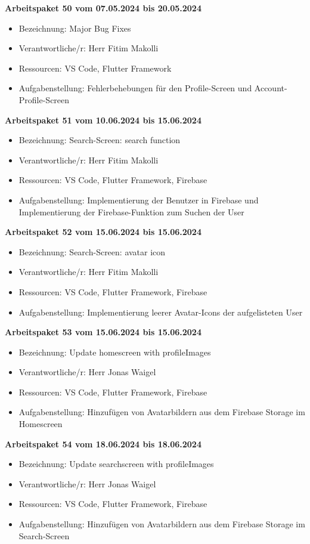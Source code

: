 \textbf{Arbeitspaket 50 vom 07.05.2024 bis 20.05.2024}
\begin{itemize}[itemsep=0pt]
    \item{Bezeichnung: Major Bug Fixes} 
	\item{Verantwortliche/r: Herr Fitim Makolli} 
	\item{Ressourcen: VS Code, Flutter Framework} 
    \item{Aufgabenstellung: Fehlerbehebungen für den Profile-Screen und Account-Profile-Screen}
\end{itemize} 

\newpage
\textbf{Arbeitspaket 51 vom 10.06.2024 bis 15.06.2024}
\begin{itemize}[itemsep=0pt]
    \item{Bezeichnung: Search-Screen: search function} 
	\item{Verantwortliche/r: Herr Fitim Makolli} 
	\item{Ressourcen: VS Code, Flutter Framework, Firebase} 
    \item{Aufgabenstellung: Implementierung der Benutzer in Firebase und Implementierung der Firebase-Funktion zum Suchen der User}
\end{itemize} 

\textbf{Arbeitspaket 52 vom 15.06.2024 bis 15.06.2024}
\begin{itemize}[itemsep=0pt]
    \item{Bezeichnung: Search-Screen: avatar icon} 
	\item{Verantwortliche/r: Herr Fitim Makolli} 
	\item{Ressourcen: VS Code, Flutter Framework, Firebase} 
    \item{Aufgabenstellung: Implementierung leerer Avatar-Icons der aufgelisteten User}
\end{itemize} 

\textbf{Arbeitspaket 53 vom 15.06.2024 bis 15.06.2024}
\begin{itemize}[itemsep=0pt]
    \item{Bezeichnung: Update homescreen with profileImages} 
	\item{Verantwortliche/r: Herr Jonas Waigel} 
	\item{Ressourcen: VS Code, Flutter Framework, Firebase} 
    \item{Aufgabenstellung: Hinzufügen von Avatarbildern aus dem Firebase Storage im Homescreen}
\end{itemize}

\textbf{Arbeitspaket 54 vom 18.06.2024 bis 18.06.2024}
\begin{itemize}[itemsep=0pt]
    \item{Bezeichnung: Update searchscreen with profileImages} 
	\item{Verantwortliche/r: Herr Jonas Waigel} 
	\item{Ressourcen: VS Code, Flutter Framework, Firebase} 
    \item{Aufgabenstellung: Hinzufügen von Avatarbildern aus dem Firebase Storage im Search-Screen}
\end{itemize}



